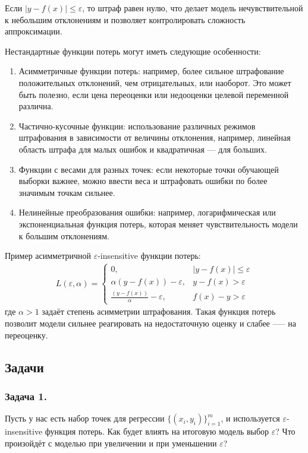 Если \(| y - f(x) | \leq \varepsilon\), то штраф равен нулю, что делает модель нечувствительной к небольшим отклонениям и позволяет контролировать сложность аппроксимации.

Нестандартные функции потерь могут иметь следующие особенности:

\begin{enumerate}
    \item Асимметричные функции потерь: например, более сильное штрафование положительных отклонений, чем отрицательных, или наоборот. Это может быть полезно, если цена переоценки или недооценки целевой переменной различна.
    \item Частично-кусочные функции: использование различных режимов штрафования в зависимости от величины отклонения, например, линейная область штрафа для малых ошибок и квадратичная — для больших.
    \item Функции с весами для разных точек: если некоторые точки обучающей выборки важнее, можно ввести веса и штрафовать ошибки по более значимым точкам сильнее.
    \item Нелинейные преобразования ошибки: например, логарифмическая или экспоненциальная функция потерь, которая меняет чувствительность модели к большим отклонениям.
\end{enumerate}

Пример асимметричной \(\varepsilon\)-insensitive функции потерь:
\begin{align*}
    L(\varepsilon, \alpha) = 
        \begin{cases}
            0, & | y - f(x) | \leq \varepsilon \\
            \alpha(y - f(x)) - \varepsilon, & y - f(x) > \varepsilon \\
            \frac{(y - f(x))}{\alpha} - \varepsilon, & f(x) - y > \varepsilon
        \end{cases}
\end{align*}
где \(\alpha > 1\) задаёт степень асимметрии штрафования. Такая функция потерь позволит модели сильнее реагировать на недостаточную оценку и слабее —-- на переоценку.

\newpage
\subsection*{Задачи}

\subsubsection*{Задача 1.}
Пусть у нас есть набор точек для регрессии \(\{(x_i, y_i)\}_{i=1}^m\), и используется \(\varepsilon\)-insensitive функция потерь. Как будет влиять на итоговую модель выбор \(\varepsilon\)? Что произойдёт с моделью при увеличении и при уменьшении \(\varepsilon\)?

